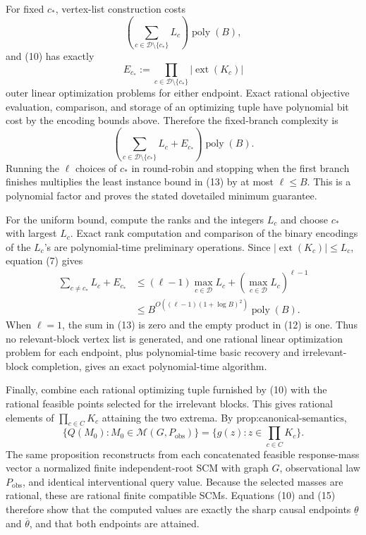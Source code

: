 For fixed \(c_*\), vertex-list construction costs
\[
 \left(\sum_{c\in\mathcal D\setminus\{c_*\}}L_c\right)
 \operatorname{poly}(B),
 \tag{11}
\]
and (10) has exactly
\[
 E_{c_*}:=
 \prod_{c\in\mathcal D\setminus\{c_*\}}
 |\operatorname{ext}(K_c)|
 \tag{12}
\]
outer linear optimization problems for either endpoint.  Exact rational objective evaluation, comparison, and storage of an optimizing tuple have polynomial bit cost by the encoding bounds above.  Therefore the fixed-branch complexity is
\[
 \left(
 \sum_{c\in\mathcal D\setminus\{c_*\}}L_c+E_{c_*}
 \right)\operatorname{poly}(B).
 \tag{13}
\]
Running the \(\ell\) choices of \(c_*\) in round-robin and stopping when the first branch finishes multiplies the least instance bound in (13) by at most \(\ell\le B\).  This is a polynomial factor and proves the stated dovetailed minimum guarantee.

For the uniform bound, compute the ranks and the integers \(L_c\) and choose \(c_*\) with largest \(L_c\).  Exact rank computation and comparison of the binary encodings of the \(L_c\)'s are polynomial-time preliminary operations.  Since \(|\operatorname{ext}(K_c)|\le L_c\), equation (7) gives
\[
 \begin{aligned}
 \sum_{c\ne c_*}L_c+E_{c_*}
 &\le (\ell-1)\max_{c\in\mathcal D}L_c
      +\left(\max_{c\in\mathcal D}L_c\right)^{\ell-1}\\
 &\le B^{O((\ell-1)(1+\log B)^2)}\operatorname{poly}(B).
 \end{aligned}
 \tag{14}
\]
When \(\ell=1\), the sum in (13) is zero and the empty product in (12) is one.  Thus no relevant-block vertex list is generated, and one rational linear optimization problem for each endpoint, plus polynomial-time basic recovery and irrelevant-block completion, gives an exact polynomial-time algorithm.

Finally, combine each rational optimizing tuple furnished by (10) with the rational feasible points selected for the irrelevant blocks.  This gives rational elements of \(\prod_{c\in C}K_c\) attaining the two extrema.  By \(\text{prop:canonical-semantics}\),
\[
 \{Q(M_0):M_0\in\mathcal M(G,P_{\mathrm{obs}})\}
 =\{g(z):z\in\prod_{c\in C}K_c\}.
 \tag{15}
\]
The same proposition reconstructs from each concatenated feasible response-mass vector a normalized finite independent-root SCM with graph \(G\), observational law \(P_{\mathrm{obs}}\), and identical interventional query value.  Because the selected masses are rational, these are rational finite compatible SCMs.  Equations (10) and (15) therefore show that the computed values are exactly the sharp causal endpoints \(\underline\theta\) and \(\overline\theta\), and that both endpoints are attained.
